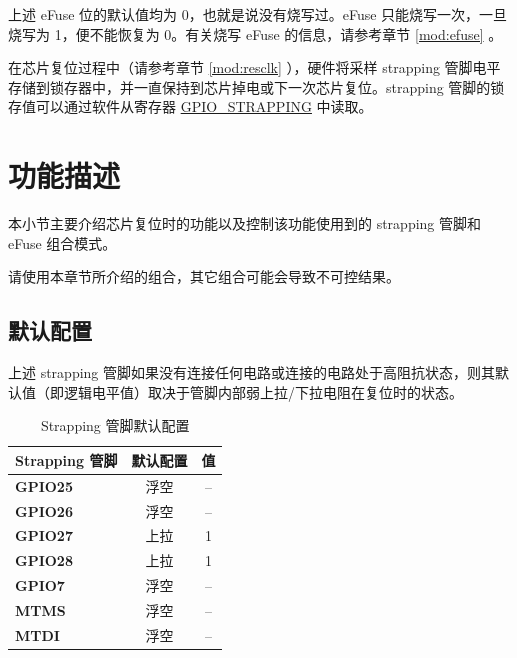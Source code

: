 \documentclass[main\_\_CN.tex]{subfiles}
\begin{document}
上述 eFuse 位的默认值均为 0，也就是说没有烧写过。eFuse 只能烧写一次，一旦烧写为 1，便不能恢复为 0。有关烧写 eFuse 的信息，请参考章节 \ref{mod:efuse} \textit{}。

在芯片复位过程中（请参考章节 \ref{mod:resclk} \textit{}），硬件将采样 strapping 管脚电平存储到锁存器中，并一直保持到芯片掉电或下一次芯片复位。strapping 管脚的锁存值可以通过软件从寄存器 \hyperref[fielddesc:GPIOSTRAPPING]{GPIO\_STRAPPING} 中读取。

\section{功能描述}

本小节主要介绍芯片复位时的功能以及控制该功能使用到的 strapping 管脚和 eFuse 组合模式。

\begin{importantlisting}
请使用本章节所介绍的组合，其它组合可能会导致不可控结果。
\end{importantlisting}

\subsection{默认配置}

上述 strapping 管脚如果没有连接任何电路或连接的电路处于高阻抗状态，则其默认值（即逻辑电平值）取决于管脚内部弱上拉/下拉电阻在复位时的状态。

\begin{table}[H]
    \centering
    \caption{Strapping 管脚默认配置}
    \label{tab:bootctrl-default-config-strapping-pins}
    \begin{tabular}{ | l | c | c | }
    \hline
        \rowcolor{lightgray}
        \textbf{Strapping 管脚} & \textbf{默认配置} & \textbf{值} \\\hline
        \textbf{GPIO25}  & 浮空 & -- \\ \hline
        \textbf{GPIO26}  & 浮空 & -- \\ \hline
        \textbf{GPIO27}  & 上拉 & 1 \\ \hline
        \textbf{GPIO28}  & 上拉 & 1 \\ \hline
        \textbf{GPIO7}   & 浮空 & -- \\ \hline
        \textbf{MTMS}   & 浮空 & -- \\ \hline
        \textbf{MTDI}   & 浮空 & -- \\ \hline
    \end{tabular}
\end{table}
\end{document}
